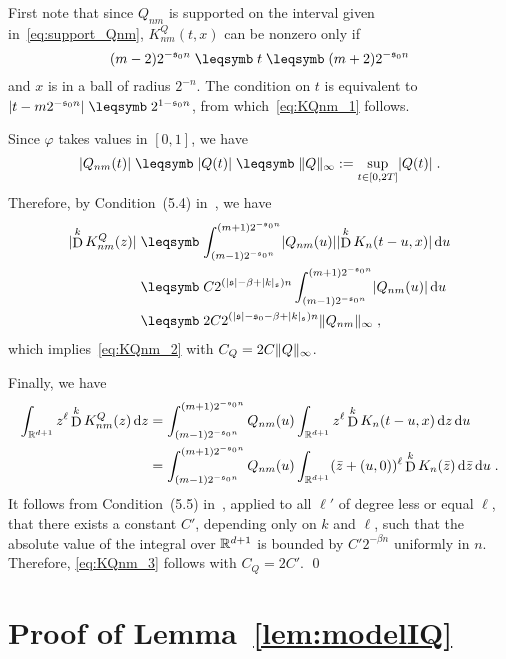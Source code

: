 \documentclass[reqno,11pt]{article}
\def\fraks{\mathfrak{s}}
\def\abss#1{\abs{#1}_\mathfrak{s}}
\DeclareMathOperator{\D}{D}            %
\begin{document}
 First note that since $Q_{nm}$ is supported on the interval
given in~\eqref{eq:support_Qnm}, $K^Q_{nm}(t,x)$ can be nonzero only if 
\begin{equation}
 (m-2)2^{-\fraks_0 n} \leqs t \leqs (m+2)2^{-\fraks_0 n}
\end{equation} 
and $x$ is in a ball of radius $2^{-n}$. The condition on $t$ is equivalent to
$\abs{t-m2^{-\fraks_0n}}\leqs 2^{1-\fraks_0 n}$, from which~\eqref{eq:KQnm_1}
follows. 

Since $\varphi$ takes values in $[0,1]$, we have 
\begin{equation}
 \abs{Q_{nm}(t)} \leqs \abs{Q(t)} \leqs \norm{Q}_\infty
 := \sup_{t\in[0,2T]} \abs{Q(t)}\;.
\end{equation} 
Therefore, by Condition~(5.4) in~\cite[Assumption~5.1]{Hairer2014}, we have
\begin{align}
\nonumber
\abs{\D^k K^Q_{nm}(z)}
&\leqs \int_{(m-1)2^{-\fraks_0n}}^{(m+1)2^{-\fraks_0n}}
\abs{Q_{nm}(u)} \abs{\D^k K_n(t-u,x)} \6u \\
\nonumber
&\leqs C 2^{(\abs{\fraks}-\beta+\abss{k})n}
\int_{(m-1)2^{-\fraks_0n}}^{(m+1)2^{-\fraks_0n}} \abs{Q_{nm}(u)}\6u \\
&\leqs 2C 2^{(\abs{\fraks}-\fraks_0-\beta+\abss{k})n} \norm{Q_{nm}}_\infty\;,
\end{align}
which implies~\eqref{eq:KQnm_2} with $C_Q = 2C\lVert Q\rVert_\infty$. 

Finally, we have 
\begin{align}
\nonumber 
\int_{\R^{d+1}}z^\ell \D^k K^Q_{nm}(z)\6z 
&= \int_{(m-1)2^{-\fraks_0n}}^{(m+1)2^{-\fraks_0n}} Q_{nm}(u) 
\int_{\R^{d+1}} z^\ell \D^k K_n(t-u,x)\6z \6u \\
&= \int_{(m-1)2^{-\fraks_0n}}^{(m+1)2^{-\fraks_0n}} Q_{nm}(u) 
\int_{\R^{d+1}} (\bar z + (u,0))^\ell \D^k K_n(\bar z)\6\bar z \6u\;.
\end{align}
It follows from Condition~(5.5) in~\cite[Assumption~5.1]{Hairer2014}, applied
to all $\ell'$ of degree less or equal $\ell$, that there exists a constant
$C'$, depending only on $k$ and $\ell$, such that the absolute value of the
integral over $\mathbb{R}^{d+1}$ is bounded by $C'2^{-\beta n}$ uniformly in $n$.
Therefore, \eqref{eq:KQnm_3} follows with $C_Q=2C'$.
\qed


\section{Proof of Lemma~\ref{lem:modelIQ}}
\label{app:model} 
\end{document}
